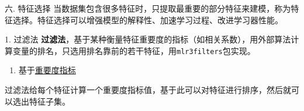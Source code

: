 \documentclass[
  11pt,
  ignorenonframetext,
  dvipsnames,UTF8]{beamer}
\newenvironment{Shaded}{\begin{snugshade}}{\end{snugshade}}
\newcommand{\CommentTok}[1]{\textcolor[rgb]{0.56,0.35,0.01}{\textit{#1}}}
\newcommand{\FunctionTok}[1]{\textcolor[rgb]{0.00,0.00,0.00}{#1}}
\newcommand{\NormalTok}[1]{#1}
\newcommand{\OtherTok}[1]{\textcolor[rgb]{0.56,0.35,0.01}{#1}}
\newcommand{\SpecialCharTok}[1]{\textcolor[rgb]{0.00,0.00,0.00}{#1}}
\newcommand{\StringTok}[1]{\textcolor[rgb]{0.31,0.60,0.02}{#1}}
\providecommand{\tightlist}{%
  \setlength{\itemsep}{0pt}\setlength{\parskip}{0pt}}
\begin{document}
\begin{frame}[fragile]{六. 特征选择}
\protect\hypertarget{ux516d.-ux7279ux5f81ux9009ux62e9}{}
当数据集包含很多特征时，只提取最重要的部分特征来建模，称为特征选择。特征选择可以增强模型的解释性、加速学习过程、改进学习器性能。

\begin{block}{1. 过滤法}
\protect\hypertarget{ux8fc7ux6ee4ux6cd5}{}
\textbf{过滤法}，基于某种衡量特征重要度的指标（如相关系数），用外部算法计算变量的排名，只选用排名靠前的若干特征，用\texttt{mlr3filters}包实现。

\begin{enumerate}
[(1)]
\tightlist
\item
  基于\href{https://mlr3filters.mlr-org.com/\#implemented-filters}{重要度指标}
\end{enumerate}

过滤法给每个特征计算一个重要度指标值，基于此可以对特征进行排序，然后就可以选出特征子集。
\end{block}
\end{frame}

\begin{frame}[fragile]{}
\protect\hypertarget{section-44}{}
\begin{Shaded}
\end{Shaded}
\end{frame}
\end{document}
